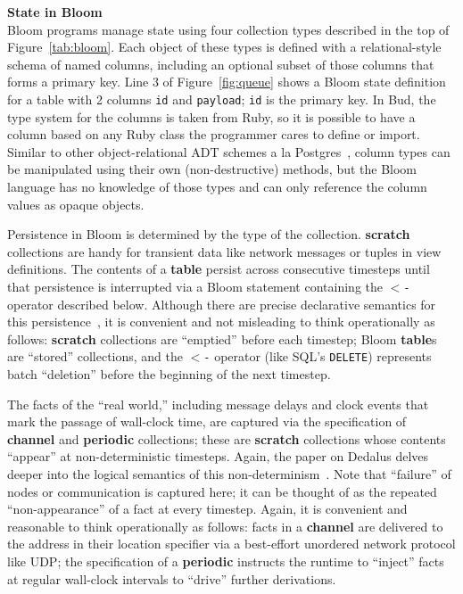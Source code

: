 \noindent\textbf{State in Bloom}\\
\noindent
Bloom programs manage state using four collection types described in the top of Figure~\ref{tab:bloom}. Each object of these types is defined with a relational-style schema of named columns, including an optional subset of those columns that forms a primary key.  Line 3 of Figure~\ref{fig:queue} shows a Bloom state definition for a table with 2 columns \texttt{id} and \texttt{payload}; \texttt{id} is the primary key.  In Bud, the type system for the columns is taken from Ruby, so it is possible to have a column based on any Ruby class the programmer cares to define or import.  Similar to other object-relational ADT schemes a la Postgres~\cite{postgres-adt}, column types can be manipulated using their own (non-destructive) methods, but the Bloom language has no knowledge of those types and can only reference the column values as opaque objects.  

Persistence in Bloom is determined by the type of the collection.  \textbf{scratch} collections are handy for transient data like network messages or tuples in view definitions.  The contents of a \textbf{table} persist across consecutive timesteps until that persistence is interrupted via a Bloom statement containing the \texttt{$<$-} operator described below. Although there are precise declarative semantics for this persistence~\cite{dedalus-techr}, it is convenient and not misleading to think operationally as follows: \textbf{scratch} collections are ``emptied'' before each timestep; Bloom \textbf{table}s are ``stored'' collections, and the \texttt{$<$-} operator (like SQL's \texttt{DELETE}) represents batch ``deletion'' before the beginning of the next timestep.

The facts of the ``real world,'' including message delays and clock events that mark the passage of wall-clock time, are captured via the specification of \textbf{channel} and \textbf{periodic} collections; these are \textbf{scratch} collections whose contents ``appear'' at non-deterministic timesteps. 
Again, the paper on Dedalus delves deeper into the logical semantics of this non-determinism~\cite{dedalus-techr}.  Note that ``failure'' of nodes or communication is captured here; it can be thought of as the repeated ``non-appearance'' of a fact at every timestep.  Again, it is convenient and reasonable to think operationally as follows: facts in a \textbf{channel} are delivered to the address in their location specifier via a best-effort unordered network protocol like UDP; the specification of a \textbf{periodic} instructs the runtime to ``inject'' facts at regular wall-clock intervals to ``drive'' further derivations.

